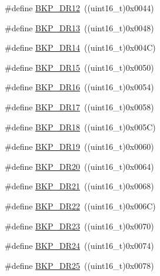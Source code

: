 \begin{DoxyCompactItemize}
\item 
\#define \mbox{\hyperlink{group___data___backup___register_ga56c63e631781366c4c0c289a27eb325f}{B\+K\+P\+\_\+\+D\+R12}}~((uint16\+\_\+t)0x0044)
\item 
\#define \mbox{\hyperlink{group___data___backup___register_ga35202788ca784ad00d2ee11d54990c86}{B\+K\+P\+\_\+\+D\+R13}}~((uint16\+\_\+t)0x0048)
\item 
\#define \mbox{\hyperlink{group___data___backup___register_ga47211005caa15e93e138691ba9bf2fa1}{B\+K\+P\+\_\+\+D\+R14}}~((uint16\+\_\+t)0x004\+C)
\item 
\#define \mbox{\hyperlink{group___data___backup___register_ga230f292dd8ef4e259630fd4f37d75869}{B\+K\+P\+\_\+\+D\+R15}}~((uint16\+\_\+t)0x0050)
\item 
\#define \mbox{\hyperlink{group___data___backup___register_ga4e12740ecfe8fcce668263c21df5492d}{B\+K\+P\+\_\+\+D\+R16}}~((uint16\+\_\+t)0x0054)
\item 
\#define \mbox{\hyperlink{group___data___backup___register_ga2d7c7e1c601b0313e60d876560a34329}{B\+K\+P\+\_\+\+D\+R17}}~((uint16\+\_\+t)0x0058)
\item 
\#define \mbox{\hyperlink{group___data___backup___register_ga43856bf6f92d07ffea0f96f5243ed8a2}{B\+K\+P\+\_\+\+D\+R18}}~((uint16\+\_\+t)0x005\+C)
\item 
\#define \mbox{\hyperlink{group___data___backup___register_ga67587a68a981d5d8e0b1302d21db1f9b}{B\+K\+P\+\_\+\+D\+R19}}~((uint16\+\_\+t)0x0060)
\item 
\#define \mbox{\hyperlink{group___data___backup___register_gaafdc2f269b669c81734360e09d94cee2}{B\+K\+P\+\_\+\+D\+R20}}~((uint16\+\_\+t)0x0064)
\item 
\#define \mbox{\hyperlink{group___data___backup___register_gabb044653f8eda603075107603949d84a}{B\+K\+P\+\_\+\+D\+R21}}~((uint16\+\_\+t)0x0068)
\item 
\#define \mbox{\hyperlink{group___data___backup___register_gab78636475b284bbaeb819d510cfcc397}{B\+K\+P\+\_\+\+D\+R22}}~((uint16\+\_\+t)0x006\+C)
\item 
\#define \mbox{\hyperlink{group___data___backup___register_gafe53f4315942eeb540b307a2b534dc2a}{B\+K\+P\+\_\+\+D\+R23}}~((uint16\+\_\+t)0x0070)
\item 
\#define \mbox{\hyperlink{group___data___backup___register_ga7fa403483a916fa56826a5f7f79551e4}{B\+K\+P\+\_\+\+D\+R24}}~((uint16\+\_\+t)0x0074)
\item 
\#define \mbox{\hyperlink{group___data___backup___register_ga99c4f81f642716e6b4544284d938ee9f}{B\+K\+P\+\_\+\+D\+R25}}~((uint16\+\_\+t)0x0078)

\end{DoxyCompactItemize}
